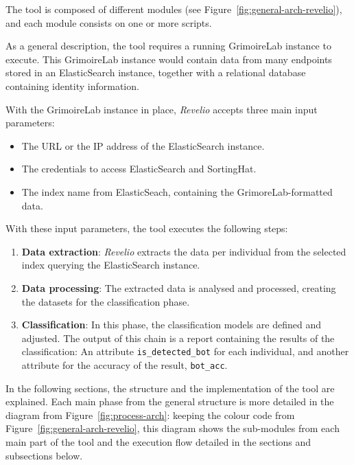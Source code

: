 \documentclass[a4paper, 12pt]{book}
\begin{document}

The tool is composed of different modules (see Figure~\ref{fig:general-arch-revelio}), and each module consists on one or more scripts.

As a general description, the tool requires a running GrimoireLab instance to execute. This GrimoireLab instance would contain data from many endpoints stored in an ElasticSearch instance, together with a relational database containing identity information.

With the GrimoireLab instance in place, \emph{Revelio} accepts three main input parameters:
\begin{itemize}
    \item The URL or the IP address of the ElasticSearch instance.
    \item The credentials to access ElasticSearch and SortingHat.
    \item The index name from ElasticSeach, containing the GrimoreLab-formatted data.
\end{itemize}

With these input parameters, the tool executes the following steps:

\begin{enumerate}
    \item \textbf{Data extraction}: \emph{Revelio} extracts the data
    per individual from the selected index querying the
    ElasticSearch instance.
    \item \textbf{Data processing}: The extracted data is analysed
    and processed, creating the datasets for the classification
    phase.
    \item \textbf{Classification}: In this phase, the classification
    models are defined and adjusted. The output of this chain is a
    report containing the results of the classification: An
    attribute \texttt{is\_detected\_bot} for each individual, and
    another attribute for the accuracy of the result, \texttt{bot\_acc}.
\end{enumerate}

In the following sections, the structure and the implementation of the tool are explained. Each main phase from the general structure is more detailed in the diagram from Figure~\ref{fig:process-arch}: keeping the colour code from Figure~\ref{fig:general-arch-revelio}, this diagram shows the sub-modules from each main part of the tool and the execution flow detailed in the sections and subsections below.
\end{document}
